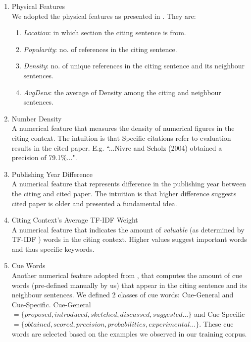 \begin{enumerate}
\item Physical Features \\
We adopted the physical features as presented in \cite{dongensemble}. They are:
\begin{enumerate}
\item \textit{Location}: in which section the citing sentence is from.
\item \textit{Popularity}: no. of references in the citing sentence.
\item \textit{Density}: no. of unique references in the citing sentence and its neighbour sentences.
\item \textit{AvgDens}: the average of Density among the citing and neighbour sentences.
\end{enumerate}

\item Number Density \\
A numerical feature that measures the density of numerical figures in the citing context. The intuition is that Specific citations refer to evaluation results in the cited paper. E.g. ``...Nivre and Scholz (2004) obtained a precision of 79.1\%...".

\item Publishing Year Difference \\
A numerical feature that represents difference in the publishing year between the citing and cited paper. The intuition is that higher difference suggests cited paper is older and presented a fundamental idea.

\item Citing Context's Average TF-IDF Weight \\
A numerical feature that indicates the amount of \textit{valuable} (as determined by TF-IDF \cite{irtextbook}) words in the citing context. Higher values suggest important words and thus specific keywords.

\item Cue Words \\
Another numerical feature adopted from \cite{dongensemble}, that computes the amount of cue words (pre-defined manually by us) that appear in the citing sentence and its neighbour sentences. We defined 2 classes of cue words: Cue-General and Cue-Specific. Cue-General $ = \{proposed, introduced, sketched, discussed, suggested\ldots \}$ and Cue-Specific $ = \{obtained, scored, precision, probabilities, experimental\ldots \}$. These cue words are selected based on the examples we observed in our training corpus.
\end{enumerate}

